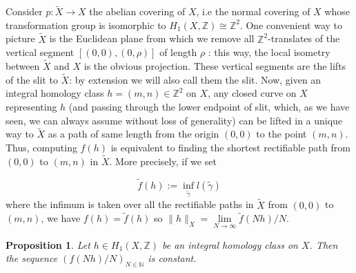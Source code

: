\documentclass{article}
\newcommand{\NN}{\mathbb{N}}
\newcommand{\ZZ}{\mathbb{Z}}
\newcommand{\St}[1]{\|#1\|_X}
\newtheorem{prop}[thm]{Proposition}
\theoremstyle{definition}
\begin{document}
Consider $p:\tilde{X}\longrightarrow  X$ the abelian covering of $X$, i.e the normal covering of $X$ whose transformation group is isomorphic to $H_1(X,\ZZ) \cong \ZZ^2$. One convenient way to picture $\tilde{X}$ is the Euclidean plane from which we remove all $\ZZ^2$-translates of the vertical segment $[(0,0),(0,\rho)]$ of length $\rho$ : this way, the local isometry between $\tilde{X}$ and $X$ is the obvious projection. These vertical segments are the lifts of the slit to $\tilde{X}$: by extension we will also call them the slit. Now, given an integral homology class $h=(m,n)\in\ZZ^2$ on $X$, any closed curve on $X$ representing $h$ (and passing through the lower endpoint of slit, which, as we have seen, we can always assume without loss of generality) can be lifted in a unique way to $\tilde{X}$ as a path  of same length from the origin $(0,0)$ to the point $(m,n)$. Thus, computing $f(h)$ is equivalent to finding the shortest rectifiable path from $(0,0)$ to $(m,n)$ in $\tilde{X}$. More precisely, if we set
	
	$$ \tilde{f}(h) := \inf\limits_{\tilde{\gamma}} l(\tilde{\gamma})$$
	where the infimum is taken over all the rectifiable paths in $\tilde{X}$ from $(0,0)$ to $(m,n)$, we have $f(h) = \tilde{f} (h)$ so $\St{h}= \lim\limits_{N\to \infty} \tilde{f}(Nh)/N$.
	
	\begin{prop}
		Let $h\in H_1(X,\ZZ)$ be an integral homology class on $X$. Then the sequence $(f(Nh)/N)_{N\in\NN}$ is constant.
	\end{prop}
\end{document}
